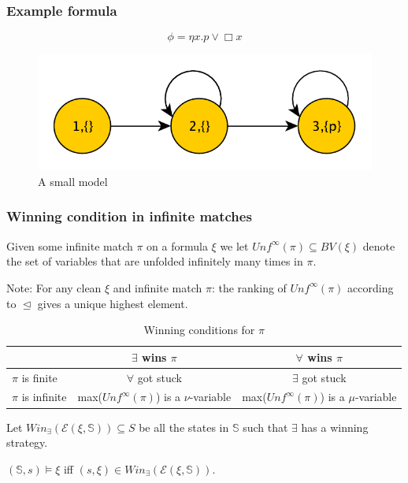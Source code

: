 \subsubsection{Example formula}
\label{sec:example-formula}
\[\phi= \eta x.p \lor \Box x\]
 \begin{figure}[h!]
   \centering
   \includegraphics[scale=.8]{smalmoddel}
   \caption{A small model}
 \end{figure}

 \subsubsection{Winning condition in infinite matches}
 \label{sec:winn-cond-infin}
 \begin{definition}
   \label{def:5}
   Given some infinite match $\pi$ on a formula $\xi$ we let
   $Unf^{\infty}(\pi)\subseteq BV(\xi) $ denote the set of variables that are
   unfolded infinitely many times in $\pi$.
 \end{definition}
 Note: For any clean $\xi$ and infinite match $\pi$: the ranking of
 $Unf^{\infty}(\pi)$ according to $\trianglelefteq$ gives a unique highest
 element.


   \begin{table}[h!]
     \centering
     \begin{tabular}{|l|c|c|}
       \hline       & $\exists$ wins $\pi$ & $\forall$ wins $\pi$ \\ \hline
       $\pi$ is finite & $\forall$ got stuck & $\exists$ got stuck\\
       $\pi$ is infinite & max($Unf^{\infty}(\pi)$) is a $\nu$-variable & max($Unf^{\infty}(\pi)$) is a $\mu$-variable  \\\hline    
     \end{tabular}
     \caption{Winning conditions for $\pi$}
     \label{not:winningconditions}
   \end{table}
   \begin{definition}
     \label{def:6}
     Let $Win_{\exists}(\mathcal{E}(\xi,\mathbb{S})) \subseteq S$ be all the states in $\mathbb
     S$ such that $\exists$ has a winning strategy.
   \end{definition}
   \begin{definition}
     \label{def:7}
     $(\mathbb{S},s)\models \xi $ iff $(s,\xi) \in Win_{\exists}(\mathcal{E}(\xi,\mathbb{S})).$
   \end{definition}

